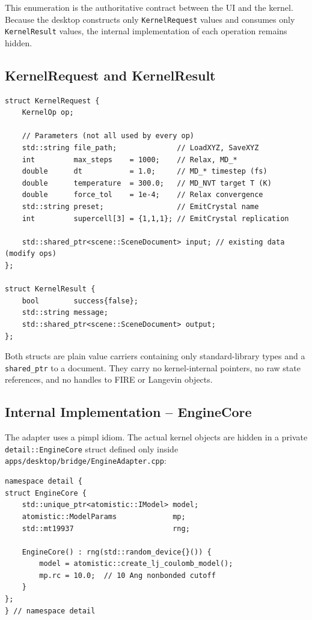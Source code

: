 ﻿\documentclass[11pt]{article}
\newcommand{\file}[1]{\texttt{#1}}
\newcommand{\type}[1]{\texttt{#1}}
\begin{document}
This enumeration is the authoritative contract between the UI and the kernel.
Because the desktop constructs only \type{KernelRequest} values and consumes
only \type{KernelResult} values, the internal implementation of each
operation remains hidden.

\subsection{KernelRequest and KernelResult}

\begin{lstlisting}
struct KernelRequest {
    KernelOp op;

    // Parameters (not all used by every op)
    std::string file_path;              // LoadXYZ, SaveXYZ
    int         max_steps    = 1000;    // Relax, MD_*
    double      dt           = 1.0;     // MD_* timestep (fs)
    double      temperature  = 300.0;   // MD_NVT target T (K)
    double      force_tol    = 1e-4;    // Relax convergence
    std::string preset;                 // EmitCrystal name
    int         supercell[3] = {1,1,1}; // EmitCrystal replication

    std::shared_ptr<scene::SceneDocument> input; // existing data (modify ops)
};

struct KernelResult {
    bool        success{false};
    std::string message;
    std::shared_ptr<scene::SceneDocument> output;
};
\end{lstlisting}

Both structs are plain value carriers containing only standard-library types
and a \type{shared\_ptr} to a document. They carry no kernel-internal
pointers, no raw state references, and no handles to FIRE or Langevin
objects.

\subsection{Internal Implementation -- EngineCore}

The adapter uses a pimpl idiom. The actual kernel objects are hidden in a
private \type{detail::EngineCore} struct defined only inside
\file{apps/desktop/bridge/EngineAdapter.cpp}:

\begin{lstlisting}
namespace detail {
struct EngineCore {
    std::unique_ptr<atomistic::IModel> model;
    atomistic::ModelParams             mp;
    std::mt19937                       rng;

    EngineCore() : rng(std::random_device{}()) {
        model = atomistic::create_lj_coulomb_model();
        mp.rc = 10.0;  // 10 Ang nonbonded cutoff
    }
};
} // namespace detail
\end{lstlisting}
\end{document}
